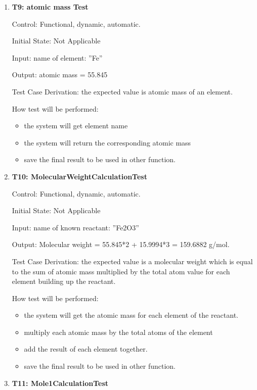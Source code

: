 \documentclass[12pt, titlepage]{article}
\begin{document}
\begin{enumerate}

\item{\bf T9: atomic mass Test\\}

Control: Functional, dynamic, automatic.
					
Initial State: Not Applicable
					
Input: name of element: ”Fe”
				
Output:  atomic mass = 55.845

Test Case Derivation: the expected value is atomic mass of an element.
					
How test will be performed: 
\begin{itemize}
\item the system will get element name
\item the system will return the corresponding atomic mass
\item save the final result to be used in other function.
\end{itemize}

\item{\bf T10: MolecularWeightCalculationTest\\}

Control: Functional, dynamic, automatic.
					
Initial State: Not Applicable
					
Input: name of known reactant: ”Fe2O3”
				
Output:  Molecular weight = 55.845*2 + 15.9994*3 =  159.6882 g/mol. 

Test Case Derivation: the expected value is a molecular weight which is equal to the sum of  atomic mass multiplied by the total atom value for each element building up the reactant. 
					
How test will be performed: 
\begin{itemize}
\item the system will get the atomic mass for each element of the reactant.
\item multiply each atomic mass by the total atoms of the element 
\item add the result of each element together.
\item save the final result to be used in other function.
\end{itemize}

\item{\bf T11: Mole1CalculationTest \\}


\end{enumerate}
\end{document}
